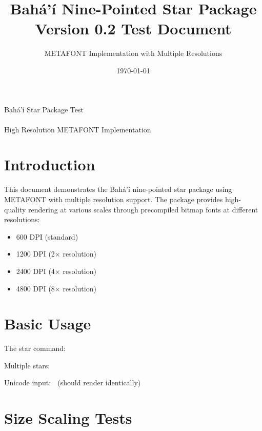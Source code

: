 \documentclass{article}
\begin{document}
\begin{center}
\vspace{2cm}
{\Huge Bahá'í Star Package Test}\\[2cm]
\scalebox{25}{\bahaistar}\\[1cm]
{\large High Resolution METAFONT Implementation}
\vspace{2cm}
\end{center}

\newpage

\title{Bahá'í Nine-Pointed Star Package\\Version 0.2 Test Document}
\author{METAFONT Implementation with Multiple Resolutions}
\date{\today}
\maketitle

\section{Introduction}

This document demonstrates the Bahá'í nine-pointed star package using METAFONT with multiple resolution support. The package provides high-quality rendering at various scales through precompiled bitmap fonts at different resolutions:

\begin{itemize}
\item 600 DPI (standard)
\item 1200 DPI (2× resolution)
\item 2400 DPI (4× resolution)
\item 4800 DPI (8× resolution)
\end{itemize}

\section{Basic Usage}

The star command: \bahaistar

Multiple stars: \bahaistar{} \bahaistar{} \bahaistar

Unicode input: 🟙 (should render identically)

\section{Size Scaling Tests}
\end{document}
